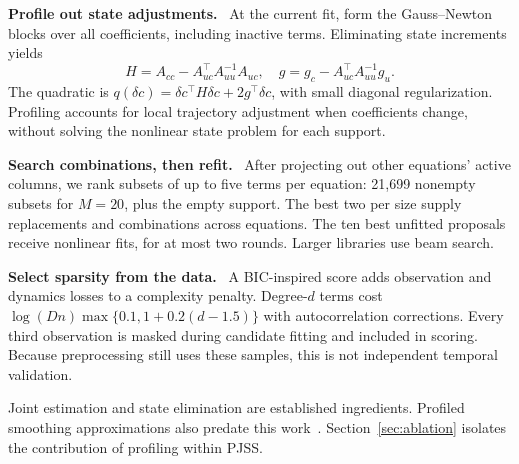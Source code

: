 \documentclass[letterpaper,10pt]{article}
\newcommand{\lead}[1]{\par\smallskip\noindent\textbf{#1}\ }
\begin{document}
\begin{minipage}[t]{0.478\textwidth}\vspace{0pt}
\begin{center}
\centering
{}
\label{fig:method}
\end{center}

\lead{Profile out state adjustments.} At the current fit, form the Gauss--Newton blocks over all coefficients, including inactive terms. Eliminating state increments yields
\begin{equation}
 H=A_{cc}-A_{uc}^{\top}A_{uu}^{-1}A_{uc},\quad
 g=g_c-A_{uc}^{\top}A_{uu}^{-1}g_u.
 \label{eq:profile}
\end{equation}
The quadratic is $q(\delta c)=\delta c^\top H\delta c+2g^\top\delta c$, with small diagonal regularization. Profiling accounts for local trajectory adjustment when coefficients change, without solving the nonlinear state problem for each support.

\lead{Search combinations, then refit.} After projecting out other equations' active columns, we rank subsets of up to five terms per equation: 21,699 nonempty subsets for $M=20$, plus the empty support. The best two per size supply replacements and combinations across equations. The ten best unfitted proposals receive nonlinear fits, for at most two rounds. Larger libraries use beam search.

\lead{Select sparsity from the data.} A BIC-inspired score adds observation and dynamics losses to a complexity penalty. Degree-$d$ terms cost $\log(Dn)\max\{0.1,1+0.2(d-1.5)\}$ with autocorrelation corrections. Every third observation is masked during candidate fitting and included in scoring. Because preprocessing still uses these samples, this is not independent temporal validation.

Joint estimation and state elimination are established ingredients. Profiled smoothing approximations also predate this work~\cite{zhang}. Section~\ref{sec:ablation} isolates the contribution of profiling within PJSS.
\end{minipage}
\end{document}
